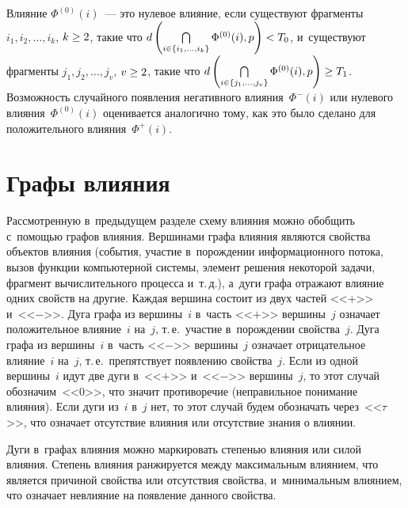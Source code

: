 \begin{multicols}{2}
  Влияние $\Phi^{(0)}(i)$~--- это нулевое влияние, если существуют 
фрагменты $i_1,i_2,\ldots, i_k$, $k\hm\geq2$, такие что  $d 
\left( \mathop{\bigcap}\limits_{i\in\{i_1,\ldots,i_k\}} \Phi^{(0)}(i),p\right)\hm< T_0$, 
и~существуют фрагменты $j_1, j_2, \ldots ,j_v$, $v\hm\geq 2$, такие что $d 
\left( \mathop{\bigcap}\limits_{i\in\{ j_1,\ldots, j_v\}} \Phi^{(0)}(i),p\right)\hm\geq 
T_1$. Возможность случайного появления негативного влияния~$\Phi^-(i)$ или 
нулевого влияния~$\Phi^{(0)}(i)$ оценивается аналогично тому, как это было 
сделано для положительного влияния~$\Phi^+(i)$. 
  
\section{Графы влияния}

  Рассмотренную в~предыдущем разделе схему влияния можно обобщить 
с~помощью графов влияния. Вершинами графа влияния являются свойства 
объектов влияния (события, участие в~по\-рож\-де\-нии информационного потока, 
вызов функции компьютерной системы, элемент решения некоторой задачи, 
фрагмент вычислительного процесса и~т.\,д.), а~дуги графа отражают влияние 
одних свойств на другие. Каждая вершина состоит из двух частей <<$+$>> 
и~<<$-$>>. Дуга графа из вершины~$i$ в~часть <<$+$>> вершины~$j$ означает 
положительное влияние~$i$ на~$j$, т.\,е.\ участие в~порождении свойства~$j$. 
Дуга графа из вершины~$i$ в~часть <<$-$>> вершины~$j$ означает 
отрицательное влияние~$i$ на~$j$, т.\,е.\ препятствует появлению свойства~$j$. 
Если из одной вершины~$i$ идут две дуги в~<<$+$>> и~<<$-$>> вершины~$j$, 
то этот случай обозначим~<<0>>, что значит противоречие (неправильное 
понимание влияния). Если дуги из~$i$ в~$j$ нет, то этот случай будем 
обозначать через~<<$\tau$>>, что означает отсутствие влияния или отсутствие 
знания о влиянии. 
  
  Дуги в~графах влияния можно маркировать степенью влияния или силой 
влияния. Степень влияния ранжируется между максимальным влиянием, что 
является причиной свойства или отсутствия свойства, и~минимальным 
влиянием, что означает невлияние на появление данного свойства. 
  

\end{multicols}
